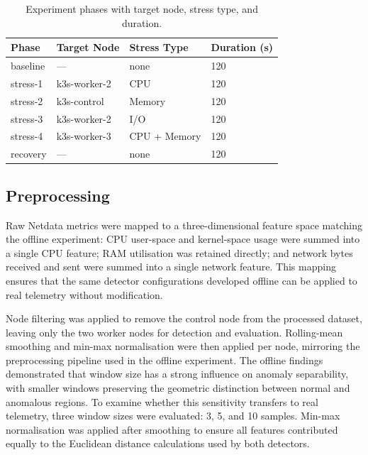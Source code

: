 \begin{table}[h]
    \centering
    \begin{tabular}{llll}
        \hline
        \textbf{Phase} & \textbf{Target Node} & \textbf{Stress Type} & \textbf{Duration (s)} \\
        \hline
        baseline & --- & none & 120 \\
        stress-1 & k3s-worker-2 & CPU & 120 \\
        stress-2 & k3s-control & Memory & 120 \\
        stress-3 & k3s-worker-2 & I/O & 120 \\
        stress-4 & k3s-worker-3 & CPU + Memory & 120 \\
        recovery & --- & none & 120 \\
        \hline
    \end{tabular}
    \caption{Experiment phases with target node, stress type, and duration.}
    \label{tab:experiment-phases}
\end{table}

\subsection{Preprocessing}

Raw Netdata metrics were mapped to a three-dimensional feature space matching the offline experiment: CPU user-space and kernel-space usage were summed into a single CPU feature; RAM utilisation was retained directly; and network bytes received and sent were summed into a single network feature. This mapping ensures that the same detector configurations developed offline can be applied to real telemetry without modification.

Node filtering was applied to remove the control node from the processed dataset, leaving only the two worker nodes for detection and evaluation. Rolling-mean smoothing and min-max normalisation were then applied per node, mirroring the preprocessing pipeline used in the offline experiment. The offline findings demonstrated that window size has a strong influence on anomaly separability, with smaller windows preserving the geometric distinction between normal and anomalous regions. To examine whether this sensitivity transfers to real telemetry, three window sizes were evaluated: 3, 5, and 10 samples. Min-max normalisation was applied after smoothing to ensure all features contributed equally to the Euclidean distance calculations used by both detectors.

